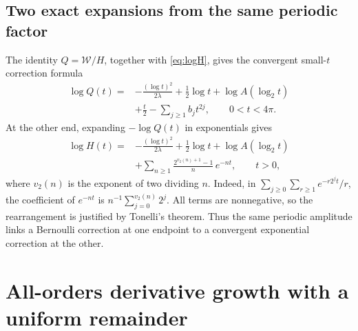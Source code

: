 \documentclass[11pt,letterpaper]{article}
\numberwithin{equation}{section}
\theoremstyle{definition}
\theoremstyle{remark}
\newcommand{\W}{\mathcal W}
\begin{document}
\subsection{Two exact expansions from the same periodic factor}
The identity $Q=\W/H$, together with \eqref{eq:logH}, gives the convergent
small-$t$ correction formula
\begin{equation}\label{eq:logQexact}
 \begin{split}
 \log Q(t)={}&-\frac{(\log t)^2}{2\lambda}+\frac12\log t
       +\log A(\log_2t)\\
 &+\frac t2-\sum_{j\ge1}b_jt^{2j},\qquad 0<t<4\pi.
 \end{split}
\end{equation}
At the other end, expanding $-\log Q(t)$ in exponentials gives
\begin{equation}\label{eq:logHlarge}
 \begin{split}
 \log H(t)={}&-\frac{(\log t)^2}{2\lambda}+\frac12\log t
       +\log A(\log_2t)\\
 &+\sum_{n\ge1}\frac{2^{v_2(n)+1}-1}{n}\,e^{-nt},\qquad t>0,
 \end{split}
\end{equation}
where $v_2(n)$ is the exponent of two dividing $n$.
Indeed, in $\sum_{j\ge0}\sum_{r\ge1}e^{-r2^jt}/r$, the coefficient of
$e^{-nt}$ is $n^{-1}\sum_{j=0}^{v_2(n)}2^j$.
All terms are nonnegative, so the rearrangement is justified by Tonelli's
theorem. Thus the same periodic amplitude links a Bernoulli correction at
one endpoint to a convergent exponential correction at the other.

\section{All-orders derivative growth with a uniform remainder}\label{sec:asymptotics}
\end{document}
